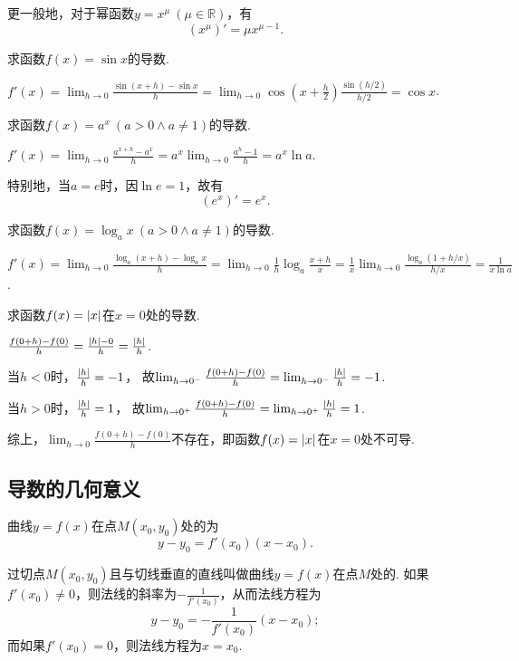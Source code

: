更一般地，对于幂函数\(y=x^{\mu}\ (\mu\in\mathbb{R})\)，有\begin{equation}
	(x^{\mu})' = \mu x^{\mu-1}.
\end{equation}

\begin{example}
求函数\(f(x) = \sin x\)的导数.
\begin{solution}
\(f'(x) = \lim_{h\to0}\frac{\sin(x+h)-\sin x}{h}
= \lim_{h\to0}{\cos(x+\frac{h}{2}) \frac{\sin(h/2)}{h/2}}
= \cos x\).
\end{solution}
\end{example}

\begin{example}
求函数\(f(x) = a^x\ (a > 0 \land a \neq 1)\)的导数.
\begin{solution}
\(f'(x)
= \lim_{h\to0}\frac{a^{x+h}-a^x}{h}
= a^x \lim_{h\to0}\frac{a^h-1}{h}
= a^x \ln a\).
\end{solution}

特别地，当\(a=e\)时，因\(\ln e = 1\)，故有\[
	(e^x)' = e^x.
\]
\end{example}

\begin{example}
求函数\(f(x) = \log_a x\ (a > 0 \land a \neq 1)\)的导数.
\begin{solution}
\(f'(x)
= \lim_{h\to0}\frac{\log_a(x+h)-\log_a x}{h}
= \lim_{h\to0}{\frac{1}{h} \log_a\frac{x+h}{x}}
= \frac{1}{x} \lim_{h\to0}\frac{\log_a(1+h/x)}{h/x}
= \frac{1}{x \ln a}\).
\end{solution}
\end{example}

\begin{example}
求函数\(f(x) = \abs{x}\)在\(x=0\)处的导数.
\begin{solution}
\(\frac{f(0+h)-f(0)}{h} = \frac{\abs{h}-0}{h} = \frac{\abs{h}}{h}\).

当\(h < 0\)时，\(\frac{\abs{h}}{h} = -1\)，
故\(\lim_{h\to0^-}\frac{f(0+h)-f(0)}{h}
= \lim_{h\to0^-}\frac{\abs{h}}{h} = -1\).

当\(h > 0\)时，\(\frac{\abs{h}}{h} = 1\)，
故\(\lim_{h\to0^+}\frac{f(0+h)-f(0)}{h}
= \lim_{h\to0^+}\frac{\abs{h}}{h} = 1\).

综上，\(\lim_{h\to0}\frac{f(0+h)-f(0)}{h}\)不存在，即函数\(f(x) = \abs{x}\)在\(x = 0\)处不可导.
\end{solution}
\end{example}

\subsection{导数的几何意义}
\begin{theorem}
曲线\(y=f(x)\)在点\(M(x_0,y_0)\)处的为\[
	y-y_0=f'(x_0)(x-x_0).
\]

过切点\(M(x_0,y_0)\)且与切线垂直的直线叫做曲线\(y=f(x)\)在点\(M\)处的.
如果\(f'(x_0) \neq 0\)，则法线的斜率为\(-\frac{1}{f'(x_0)}\)，从而法线方程为\[
	y-y_0=-\frac{1}{f'(x_0)}(x-x_0);
\]
而如果\(f'(x_0) = 0\)，则法线方程为\(x = x_0\).
\end{theorem}

